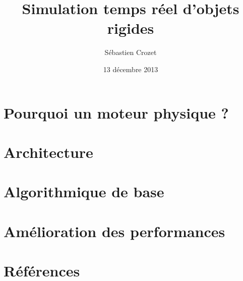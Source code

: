 \documentclass{beamer}
\date{13 décembre 2013}
\title{Simulation temps réel d'objets rigides}
\author{Sébastien Crozet}
\begin{document}
\maketitle

\section{Pourquoi un moteur physique ?}

\section{Architecture}

\section{Algorithmique de base}

\section{Amélioration des performances}


\section{Références}
\end{document}
